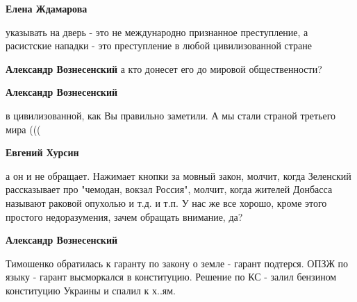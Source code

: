 \begin{itemize}
\begin{itemize}
 
\textbf{Елена Ждамарова} 

указывать на дверь - это не международно признанное преступление, а расистские
нападки - это преступление в любой цивилизованной стране


\textbf{Александр Вознесенский} а кто донесет его до мировой общественности?

 
\textbf{Александр Вознесенский} 

в цивилизованной, как Вы правильно заметили. А мы стали страной третьего мира (((

 
\textbf{Евгений Хурсин} 

а он и не обращает. Нажимает кнопки за мовный закон, молчит, когда Зеленский
рассказывает про "чемодан, вокзал Россия", молчит, когда жителей Донбасса
называют раковой опухолью и т.д. и т.п. У нас же все хорошо, кроме этого
простого недоразумения, зачем обращать внимание, да?


 
\textbf{Александр Вознесенский} 

Тимошенко обратилась к гаранту по закону о земле - гарант подтерся. ОПЗЖ по
языку - гарант высморкался в конституцию. Решение по КС - залил бензином
конституцию Украины и спалил к х..ям.


\end{itemize}
\end{itemize}

